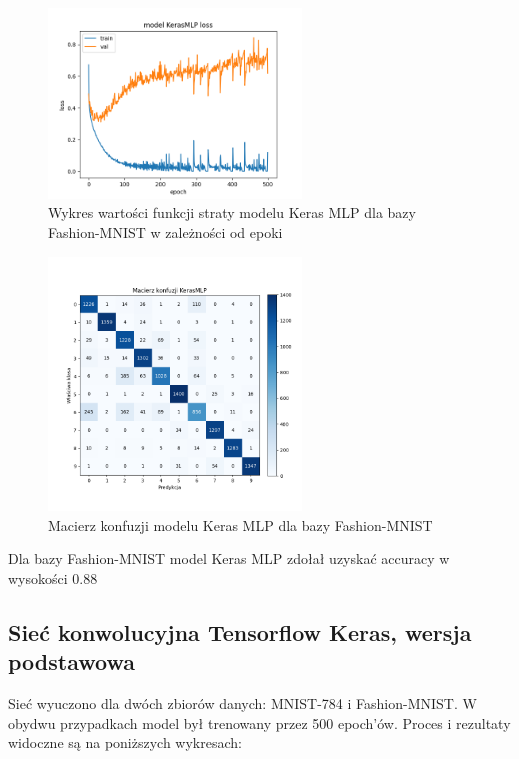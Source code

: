 \documentclass{article}
\begin{document}
\begin{figure}[H]
    \centering
    \includegraphics[width=0.6\textwidth]{../Saves/KerasMLP/fashion-mnist/KerasMLP_fashion-mnist_ep500_loss.png}
    \caption{Wykres wartości funkcji straty modelu Keras MLP dla bazy Fashion-MNIST w zależności od epoki}
\end{figure}

\begin{figure}[H]
	\centering
	\includegraphics[width=0.6\textwidth]{../Saves/KerasMLP/fashion-mnist/KerasMLP_fashion-mnist_conf_mat.png}
	\caption{Macierz konfuzji modelu Keras MLP dla bazy Fashion-MNIST}
\end{figure}
Dla bazy Fashion-MNIST model Keras MLP zdołał uzyskać accuracy w wysokości $0.88$



\subsection{Sieć konwolucyjna Tensorflow Keras, wersja podstawowa}
Sieć wyuczono dla dwóch zbiorów danych: MNIST-784 i Fashion-MNIST. W obydwu przypadkach model 
był trenowany przez 500 epoch'ów. Proces i rezultaty widoczne są na poniższych wykresach:
\end{document}
